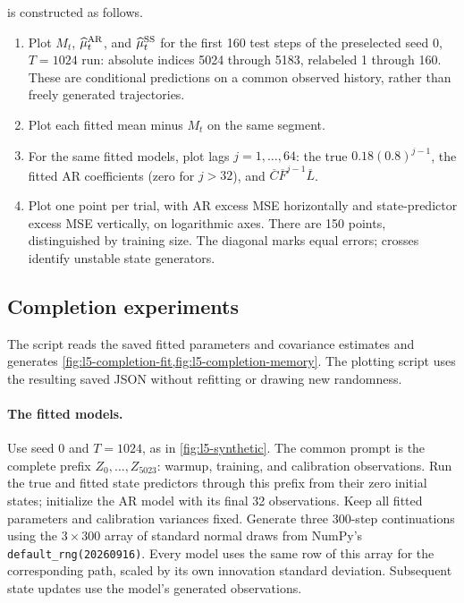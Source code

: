 \documentclass[11pt,twoside]{article}
\theoremstyle{definition}
\theoremstyle{remark}
\begin{document}
 is constructed as follows.
\begin{enumerate}[label=(\alph*),leftmargin=*]
\item Plot \(M_t\), \(\widehat\mu_t^{\rm AR}\), and
\(\widehat\mu_t^{\rm SS}\) for the first 160 test steps of the
preselected seed 0, \(T=1024\) run: absolute indices 5024 through 5183,
relabeled 1 through 160. These are conditional predictions on a common
observed history, rather than freely generated trajectories.
\item Plot each fitted mean minus \(M_t\) on the same segment.
\item For the same fitted models, plot lags \(j=1,\ldots,64\):
the true \(0.18(0.8)^{j-1}\), the fitted AR coefficients (zero for
\(j>32\)), and \(\overline C\overline F^{j-1}\overline L\).
\item Plot one point per trial, with AR excess MSE horizontally and
state-predictor excess MSE vertically, on logarithmic axes. There are
150 points, distinguished by training size. The diagonal marks equal
errors; crosses identify unstable state generators.
\end{enumerate}

\subsection{Completion experiments}
\label{app:completion-experiments}

The script  reads the saved fitted
parameters and covariance estimates and generates
\cref{fig:l5-completion-fit,fig:l5-completion-memory}.
The plotting script uses the resulting saved JSON without refitting
or drawing new randomness.

\paragraph{The fitted models.}
Use seed 0 and \(T=1024\), as in \cref{fig:l5-synthetic}. The common
prompt is the complete prefix \(Z_0,\ldots,Z_{5023}\): warmup, training,
and calibration observations. Run the true and fitted state predictors
through this prefix from their zero initial states; initialize the AR
model with its final 32 observations. Keep all fitted parameters and
calibration variances fixed. Generate three 300-step continuations
using the \(3\times300\) array of standard normal draws from NumPy's
\texttt{default\_rng(20260916)}. Every model uses the same row of this
array for the corresponding path, scaled by its own innovation standard
deviation. Subsequent state updates use the model's generated observations.
\end{document}
